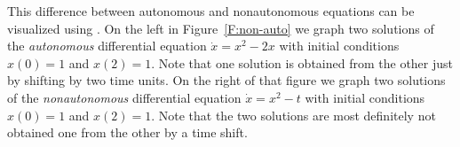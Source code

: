 \documentclass{ximera}
\begin{document}
This difference between autonomous and nonautonomous equations can be
visualized using {\dfield}. On the left in Figure~\ref{F:non-auto}
we graph two solutions of the {\em autonomous\/} differential equation
$\dot{x}=x^2-2x$ with initial conditions $x(0)=1$ and $x(2)=1$.  Note
that one solution is obtained from the other just by shifting by two
time units.  On the right of that figure we graph two solutions of the
{\em nonautonomous\/} differential equation $\dot{x}=x^2-t$ with
initial conditions $x(0)=1$ and $x(2)=1$.  Note that the two solutions
are most definitely not obtained one from the other by a time shift.

\begin{figure*}[htb]
        \centerline{%
	}
        \caption{Left: Solutions of the autonomous equation $\dot{x}=x^2-2x$
	with initial conditions $x(0)=1$ and $x(2)=1$. Right: Solution of
	the nonautonomous differential equation $\dot{x}=x^2-t$ with initial
	conditions $x(0)=1$ and $x(2)=1$.}
        \label{F:non-auto}
\end{figure*}


\EXER

\TEXER
\end{document}
